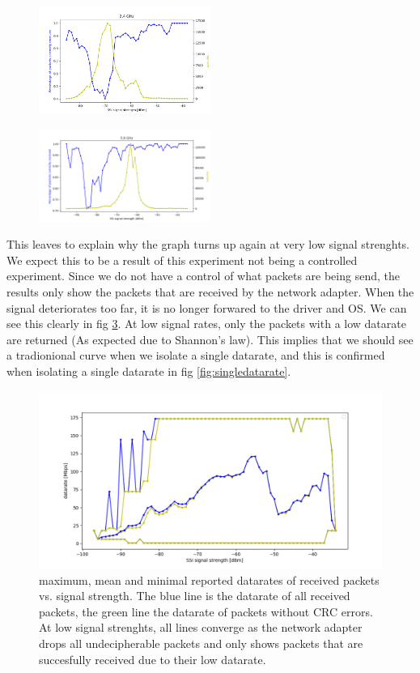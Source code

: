 \documentclass{IEEEtran}
\begin{document}
\begin{figure}
		\includegraphics[width=0.5\textwidth]{figures/24ghz.png}
		\caption{}
		\label{fig:24packets}
\end{figure}

\begin{figure}
		\includegraphics[width=0.5\textwidth]{figures/58ghz.png}
		\caption{}
		\label{fig:58packets}
\end{figure}

This leaves to explain why the graph turns up again at very low signal strenghts. We expect this to be a result of this experiment not being a controlled experiment. Since we do not have a control of what packets are being send, the results only show the packets that are received by the network adapter. When the signal deteriorates too far, it is no longer forwared to the driver and OS. We can see this clearly in fig \ref{fig:datasignal}. At low signal rates, only the packets with a low datarate are returned (As expected due to Shannon's law). This implies that we should see a tradionional curve when we isolate a single datarate, and this is confirmed when isolating a single datarate in fig \ref{fig:singledatarate}.

\begin{figure}
		\includegraphics[width=\textwidth]{figures/datarate_signal.png}
		\caption{maximum, mean and minimal reported datarates of received packets vs. signal strength. The blue line is the datarate of all received packets, the green line the datarate of packets without CRC errors. At low signal strenghts, all lines converge as the network adapter drops all undecipherable packets and only shows packets that are succesfully received due to their low datarate.}
		\label{fig:datasignal}
\end{figure}
\end{document}
